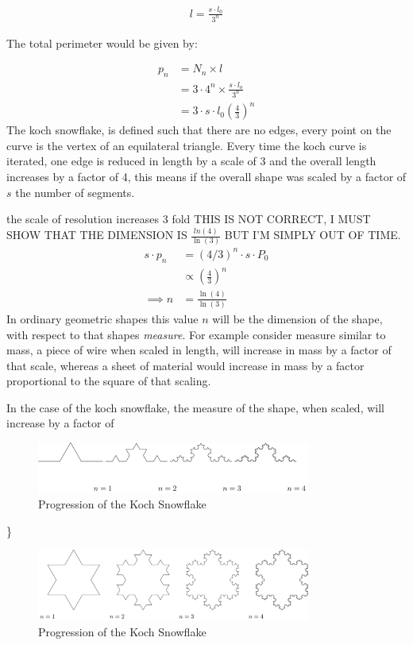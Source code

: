 \documentclass[11pt]{article}
\begin{document}
\begin{align}
l = \frac{s \cdot l_{0}}{3^{n}}
\end{align}

The total perimeter would be given by:

\begin{align}
p_{n} &= N_{n} \times l \\
&= 3\cdot 4^{n} \times \frac{s \cdot l_{o}}{3^{n}} \\
&= 3 \cdot s \cdot  l_{0} \left( \frac{4}{3} \right)^{n}
\end{align}
The koch snowflake, is defined such that there are no edges, every point on the curve is the vertex of an equilateral triangle. Every time the koch curve is iterated, one edge is reduced in length by a scale of 3 and the overall length increases by a factor of 4, this means if the overall shape was scaled by a factor of \(s\) the number of segments.

the scale of resolution increases 3 fold
THIS IS NOT CORRECT, I MUST SHOW THAT THE DIMENSION IS \(\frac{ln(4)}{\ln(3)}\) BUT I'M SIMPLY OUT OF TIME.
\begin{align}
s \cdot p_{n} &=  (4/3)^{n} \cdot s \cdot P_{0}\\
& \propto \left(\frac{4}{3}\right)^{n} \\
 \implies  n &= \frac{\ln\left( 4 \right)}{\ln\left( 3 \right)} \label{eq:koch-dim}
\end{align}
In ordinary geometric shapes this value \(n\) will be the dimension of the shape,
with respect to that shapes \emph{measure}. For example consider measure similar to mass, a piece
of wire when scaled in length, will increase in mass by a factor of that scale, whereas
a sheet of material would increase in mass by a factor proportional to the square of that scaling.

In the case of the koch snowflake, the measure of the shape, when scaled, will increase by a factor of


\begin{figure}[htbp]
\centering
\includegraphics[width=9cm]{media/tikz/Koch_line.png}
\caption{\label{koch-line}Progression of the Koch Snowflake}
\end{figure}

\}

\begin{figure}[htbp]
\centering
\includegraphics[width=9cm]{media/tikz/Snowflake.png}
\caption{\label{koch-snowflake}Progression of the Koch Snowflake}
\end{figure}
\end{document}
